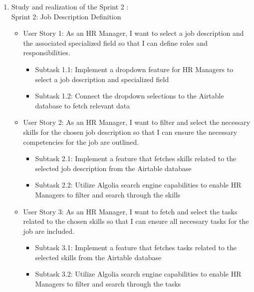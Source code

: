 \begin{enumerate}
    \item Study and realization of the Sprint 2 : \\
          Sprint 2: Job Description Definition
          \begin{itemize}
              \renewcommand\labelitemi{-}
              \item User Story 1: As an HR Manager, I want to select a job description and the associated specialized field so that I can define roles and responsibilities. \\
                    \begin{itemize}
                        \item Subtask 1.1: Implement a dropdown feature for HR Managers to select a job description and specialized field
                        \item Subtask 1.2: Connect the dropdown selections to the Airtable database to fetch relevant data
                    \end{itemize}
              \item User Story 2: As an HR Manager, I want to filter and select the necessary skills for the chosen job description so that I can ensure the necessary competencies for the job are outlined. \\
                    \begin{itemize}
                        \item Subtask 2.1: Implement a feature that fetches skills related to the selected job description from the Airtable database
                        \item Subtask 2.2: Utilize Algolia search engine capabilities to enable HR Managers to filter and search through the skills
                    \end{itemize}
              \item User Story 3: As an HR Manager, I want to fetch and select the tasks related to the chosen skills so that I can ensure all necessary tasks for the job are included. \\
                    \begin{itemize}
                        \item Subtask 3.1: Implement a feature that fetches tasks related to the selected skills from the Airtable database
                        \item Subtask 3.2: Utilize Algolia search engine capabilities to enable HR Managers to filter and search through the tasks
                    \end{itemize}

\end{itemize}
\end{enumerate}
